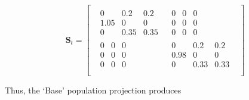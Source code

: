 \documentclass[12pt]{article}
\begin{document}
\begin{equation}
\mathbf{S}_t =
\begin{bmatrix}
\begin{array}{c|c}
\begin{matrix} 0 & 0.2 & 0.2 \\ 1.05 & 0 & 0 \\ 0 & 0.35 & 0.35 \end{matrix} &
\begin{matrix} 0 & 0 & 0 \\ 0 & 0 & 0 \\ 0 & 0 & 0 \end{matrix} \\
\hline
\begin{matrix} 0 & 0 & 0 \\ 0 & 0 & 0 \\ 0 & 0 & 0 \end{matrix} &
\begin{matrix} 0 & 0.2 & 0.2 \\ 0.98 & 0 & 0 \\ 0 & 0.33 & 0.33 \end{matrix} \\
\end{array}
\end{bmatrix}
\end{equation}

Thus, the `Base' population projection produces
\end{document}
